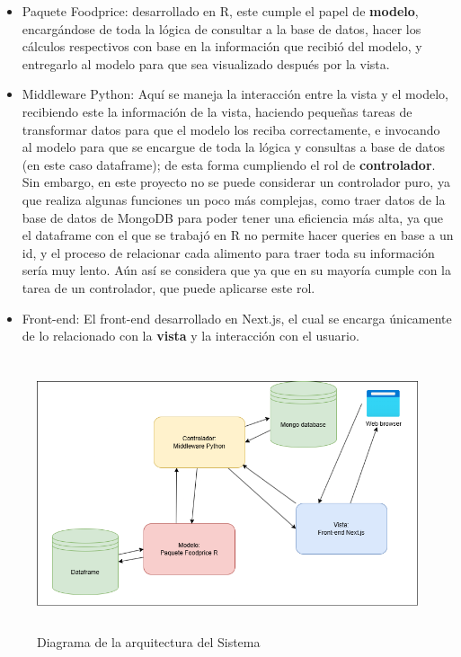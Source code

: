 \begin{itemize}
    \item Paquete Foodprice: desarrollado en R, este cumple el papel de \textbf{modelo}, encarg\'andose de toda la l\'ogica de consultar a la base de datos, hacer los c\'alculos respectivos con base en la informaci\'on que recibi\'o del modelo, y entregarlo al modelo para que sea visualizado despu\'es por la vista.
    
    \item Middleware Python: Aqu\'i se maneja  la interacci\'on entre la vista y el modelo, recibiendo este la informaci\'on de la vista, haciendo peque\~{n}as tareas de transformar datos para que el modelo los reciba correctamente, e invocando al modelo para que se encargue de toda la l\'ogica y consultas a base de datos (en este caso dataframe); de esta forma cumpliendo el rol de \textbf{controlador}. Sin embargo, en este proyecto no se puede considerar un controlador puro, ya que realiza algunas funciones un poco m\'as complejas, como traer datos de la base de datos de MongoDB para poder tener una eficiencia m\'as alta, ya que el dataframe con el que se trabaj\'o en R no permite hacer queries en base a un id, y el proceso de relacionar cada alimento para traer toda su informaci\'on ser\'ia muy lento. A\'un as\'i se considera que ya que en su mayor\'ia cumple con la tarea de un controlador, que puede aplicarse este rol.

    \item Front-end: El front-end desarrollado en Next.js, el cual se encarga \'unicamente de lo relacionado con la \textbf{vista} y  la interacci\'on con el usuario.
    
\end{itemize}

\begin{figure}[H]
        \centering
        \includegraphics[height=8cm]{img/Diseno/arquitectura.png}
        \caption{Diagrama de la arquitectura del Sistema}
        \label{fig:arquitecturaDiagrama}
\end{figure}

